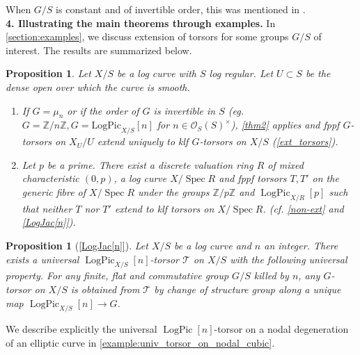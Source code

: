 \documentclass[a4paper,11pt]{amsart} %
\numberwithin{equation}{subsection}
\newcommand{\on}[1]{\operatorname{#1}}
\newcommand{\bb}[1]{{\mathbb{#1}}}
\newcommand{\ca}[1]{{\mathcal{#1}}}
\newcommand{\Spec}{\operatorname{Spec}}
\theoremstyle{definition}
\theoremstyle{plain}%
\newtheorem{proposition}[definition]{Proposition}
\theoremstyle{remark}
\begin{document}
When $G/S$ is constant and of invertible order, this was mentioned in \cite[Theorem 7.6]{illusie2002overview}.\\


\noindent\textbf{4. Illustrating the main theorems through examples.} In \ref{section:examples}, we discuss extension of torsors for some groups $G/S$ of interest. The results are summarized below.

\begin{proposition}\label{proposition:to_extend_or_not_to_extend_that_is_the_question}
    Let $X/S$ be a log curve with $S$ log regular. Let $U \subset S$ be the dense open over which the curve is smooth.
    \begin{enumerate}
        \item If $G= \mu_n$ or if the order of $G$ is invertible in $S$ (eg. $G= \bb Z/n \bb Z, G=\mathrm{ LogPic}_{X/S}[n]$ for $n\in \ca O_S(S)^\times$), \ref{thm2} applies and fppf $G$-torsors on $X_U/U$ extend uniquely to klf $G$-torsors on $X/S$ (\ref{ext_torsors}).
        \item Let $p$ be a prime. There exist a discrete valuation ring $R$ of mixed characteristic $(0,p)$, a log curve $X/\Spec R$ and fppf torsors $T,T'$ on the generic fibre of $X/\Spec R$ under the groups $\bb Z/p\bb Z$ and $\on{LogPic}_{X/R}[p]$ such that neither $T$ nor $T'$ extend to klf torsors on $X/\Spec R$. (cf. \ref{non-ext} and \ref{LogJac[n]}).
    \end{enumerate}
\end{proposition}


\begin{proposition}[\ref{LogJac[n]}]
    Let $X/S$ be a log curve and $n$ an integer. There exists a \emph{universal $\on{LogPic}_{X/S}[n]$-torsor $\ca T$ on $X/S$} with the following universal property. For any finite, flat and commutative group $G/S$ killed by $n$, any $G$-torsor on $X/S$ is obtained from $\ca T$ by change of structure group along a unique map $\on{LogPic}_{X/S}[n] \to G$.
\end{proposition}

We describe explicitly the universal $\on{LogPic}[n]$-torsor on a nodal degeneration of an elliptic curve in \ref{example:univ_torsor_on_nodal_cubic}.
\end{document}
